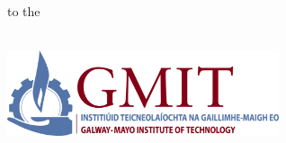 \begin{titlepage}
  \vspace{2mm}

  \begin{center}
    \begin{minipage}[t]{\textwidth}
      \centering
      {\small to the} \\[1mm]
      \thesisdepartment \\[1mm]
      \thesisinstitute
    \end{minipage}
  \end{center}

  \vspace{8mm}

  \begin{center}
    \begin{minipage}[t][30mm]{\textwidth}
      \centering
      \includegraphics[width=80mm]{img/gmit-logo.jpg} \\[4mm]
    \end{minipage}
  \end{center}

\end{titlepage}